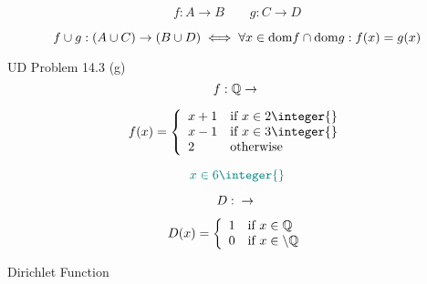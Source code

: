 \begin{frame}{}
  \[
    f: A \to B \qquad g: C \to D
  \]

  \begin{center}
  \end{center}

  \pause
  \begin{theorem}
    \[
      f \cup g: (A \cup C) \to (B \cup D) \iff
      \forall x \in \text{dom}{f} \cap \text{dom}{g}: f(x) = g(x)
    \]
  \end{theorem}

  \pause
  \begin{exampleblock}{UD Problem 14.3 (g)}
    \[
      f: \mathbb{Q} \to \real{}
    \]

    \[
      f(x) = \left\{\begin{array}{ll}
	x + 1 & \text{if } x \in 2\integer{} \\
	x - 1 & \text{if } x \in 3\integer{} \\
	2     & \text{otherwise}
      \end{array}\right.
    \]
  \end{exampleblock}

  \pause
  \vspace{-0.30cm}
  \[
    \teal{x \in 6\integer{}}
  \]
\end{frame}

%
%

\begin{frame}{}
  \[
    D: \real{} \to \real{}
  \]

  \[
    D(x) = \left\{\begin{array}{ll}
      1 & \text{if } x \in \mathbb{Q} \\
      0 & \text{if } x \in \real \setminus \mathbb{Q}
    \end{array}\right.
  \]

  \vspace{0.60cm}
  \centerline{Dirichlet Function}
\end{frame}
